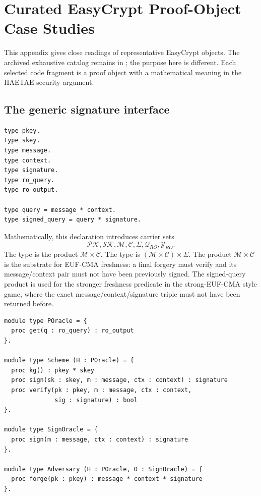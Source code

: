 \chapter{Curated EasyCrypt Proof-Object Case Studies}
\label{app:curated-easycrypt-case-studies}

This appendix gives close readings of representative EasyCrypt objects.  The
archived exhaustive catalog remains in ; the purpose here
is different.  Each selected code fragment is a proof object with a mathematical
meaning in the HAETAE security argument.

\section{The generic signature interface}
\label{app:case-sig-rom-interface}

\begin{lstlisting}[language=EasyCrypt,caption={Signature objects and ROM-query objects in \ec{Sig\_ROM.ec}.},label={lst:sig-rom-types}]
type pkey.
type skey.
type message.
type context.
type signature.
type ro_query.
type ro_output.

type query = message * context.
type signed_query = query * signature.
\end{lstlisting}

Mathematically, this declaration introduces carrier sets
\[
  \mathcal{PK},\mathcal{SK},\mathcal{M},\mathcal{C},\Sigma,
  \mathcal{Q}_{RO},\mathcal{Y}_{RO}.
\]
The type  is the product \(\mathcal{M}\times\mathcal{C}\).  The type
 is
\((\mathcal{M}\times\mathcal{C})\times\Sigma\).  The product
\(\mathcal{M}\times\mathcal{C}\) is the substrate for EUF-CMA freshness: a final
forgery must verify and its message/context pair must not have been previously
signed.  The signed-query product is used for the stronger freshness predicate in
the strong-EUF-CMA style game, where the exact message/context/signature triple
must not have been returned before.

\begin{lstlisting}[language=EasyCrypt,caption={Scheme and adversary interfaces in \ec{Sig\_ROM.ec}.},label={lst:sig-rom-module-types}]
module type POracle = {
  proc get(q : ro_query) : ro_output
}.

module type Scheme (H : POracle) = {
  proc kg() : pkey * skey
  proc sign(sk : skey, m : message, ctx : context) : signature
  proc verify(pk : pkey, m : message, ctx : context,
              sig : signature) : bool
}.

module type SignOracle = {
  proc sign(m : message, ctx : context) : signature
}.

module type Adversary (H : POracle, O : SignOracle) = {
  proc forge(pk : pkey) : message * context * signature
}.
\end{lstlisting}

